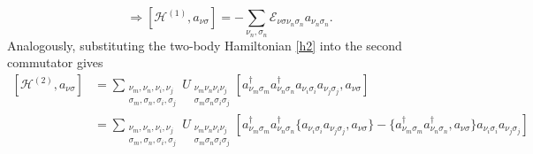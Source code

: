 \documentclass[a4paper,12pts]{article}
\numberwithin{equation}{section}
\begin{document}
	\begin{equation}
	\Longrightarrow \left[\mathcal{H}^{(1)},a_{\nu\sigma}\right] = -\sum_{\nu_n,\sigma_n}\mathcal{E}_{\nu\sigma\nu_n\sigma_n}a_{\nu_n\sigma_n}.
	\end{equation}
	Analogously, substituting the two-body Hamiltonian \ref{h2} into the second commutator gives
	\begin{align}
	\left[\mathcal{H}^{(2)},a_{\nu\sigma}\right] &= \sum_{\substack{\nu_m,\nu_n,\nu_i,\nu_j\\ \sigma_m,\sigma_n,\sigma_i,\sigma_j}}U_{\substack{\nu_m\nu_n\nu_i\nu_j\\ \sigma_m\sigma_n\sigma_i\sigma_j}}\left[a^{\dagger}_{\nu_m\sigma_m}a^{\dagger}_{\nu_n\sigma_n}a_{\nu_i\sigma_i}a_{\nu_j\sigma_j},a_{\nu\sigma}\right]\\
	&= \sum_{\substack{\nu_m,\nu_n,\nu_i,\nu_j\\ \sigma_m,\sigma_n,\sigma_i,\sigma_j}}U_{\substack{\nu_m\nu_n\nu_i\nu_j\\ \sigma_m\sigma_n\sigma_i\sigma_j}}\left[a^{\dagger}_{\nu_m\sigma_m}a^{\dagger}_{\nu_n\sigma_n}\{a_{\nu_i\sigma_i}a_{\nu_j\sigma_j},a_{\nu\sigma}\} - \{a^{\dagger}_{\nu_m\sigma_m}a^{\dagger}_{\nu_n\sigma_n},a_{\nu\sigma}\}a_{\nu_i\sigma_i}a_{\nu_j\sigma_j}\right]
	\end{align}
\end{document}
